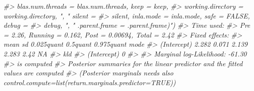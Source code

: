\documentclass[
]{book}
\newenvironment{Shaded}{\begin{snugshade}}{\end{snugshade}}
\newcommand{\CommentTok}[1]{\textcolor[rgb]{0.56,0.35,0.01}{\textit{#1}}}
\begin{document}
\begin{Shaded}
\begin{Highlighting}[]
\CommentTok{\#\textgreater{}    blas.num.threads = blas.num.threads, keep = keep, }
\CommentTok{\#\textgreater{}    working.directory = working.directory, ", " silent = }
\CommentTok{\#\textgreater{}    silent, inla.mode = inla.mode, safe = FALSE, debug = }
\CommentTok{\#\textgreater{}    debug, ", " .parent.frame = .parent.frame)") }
\CommentTok{\#\textgreater{} Time used:}
\CommentTok{\#\textgreater{}     Pre = 2.26, Running = 0.162, Post = 0.00694, Total = 2.42 }
\CommentTok{\#\textgreater{} Fixed effects:}
\CommentTok{\#\textgreater{}              mean    sd 0.025quant 0.5quant 0.975quant mode}
\CommentTok{\#\textgreater{} (Intercept) 2.282 0.071      2.139    2.283       2.42   NA}
\CommentTok{\#\textgreater{}             kld}
\CommentTok{\#\textgreater{} (Intercept)   0}
\CommentTok{\#\textgreater{} }
\CommentTok{\#\textgreater{} Marginal log{-}Likelihood:  {-}61.30 }
\CommentTok{\#\textgreater{}  is computed }
\CommentTok{\#\textgreater{} Posterior summaries for the linear predictor and the fitted values are computed}
\CommentTok{\#\textgreater{} (Posterior marginals needs also \textquotesingle{}control.compute=list(return.marginals.predictor=TRUE)\textquotesingle{})}
\end{Highlighting}
\end{Shaded}


  
\end{document}
